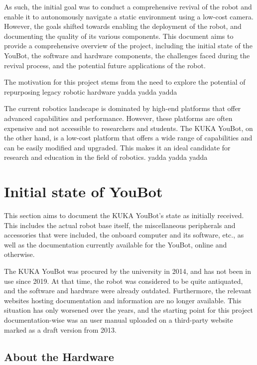 \documentclass[a4paper, 12pt]{article}
\newif\ifshowadi
\newcommand{\adi}[1]{\ifshowadi\textcolor{red}{#1}\fi}
\begin{document}
    As such, the initial goal was to conduct a comprehensive revival of the robot and enable it to autonomously navigate a static environment using a low-cost camera. However, the goals shifted towards enabling the deployment of the robot, and documenting the quality of its various components. This document aims to provide a comprehensive overview of the project, including the initial state of the YouBot, the software and hardware components, the challenges faced during the revival process, and the potential future applications of the robot.

    The motivation for this project stems from the need to explore the potential of repurposing legacy robotic hardware yadda yadda yadda

    The current robotics landscape is dominated by high-end platforms that offer advanced capabilities and performance. However, these platforms are often expensive and not accessible to researchers and students. The KUKA YouBot, on the other hand, is a low-cost platform that offers a wide range of capabilities and can be easily modified and upgraded. This makes it an ideal candidate for research and education in the field of robotics. yadda yadda yadda


        

    \pagebreak

    \section{Initial state of YouBot}

    \adi{reality check}

    This section aims to document the KUKA YouBot's state as initially received. This includes the actual robot base itself, the miscellaneous peripherals and accessories that were included, the onboard computer and its software, etc., as well as the documentation currently available for the YouBot, online and otherwise. 

    The KUKA YouBot was procured by the university in 2014, and has not been in use since 2019. At that time, the robot was considered to be quite antiquated, and the software and hardware were already outdated. Furthermore, the relevant websites hosting documentation and information are no longer available. This situation has only worsened over the years, and the starting point for this project documentation-wise was an user manual uploaded on a third-party website marked as a draft version from 2013.

    \subsection{About the Hardware}
\end{document}
